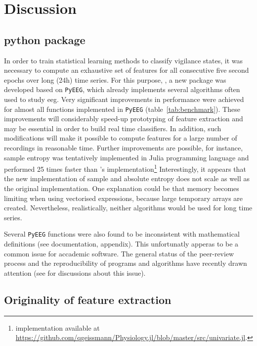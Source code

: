 \section{Discussion} \label{discussion}

\subsection{python package}
 
In order to train statistical learning methods to classify vigilance states,
it was necessary to compute an exhaustive set of features for all consecutive five second epochs
over long (24h) time series.
For this purpose, \pr{}, a new \py{} package was developed based on
\texttt{PyEEG}\citationneeded{},  which already implements several algorithms often used to study \gls{eeg}.
Very significant improvements in performance were achieved for almost all functions implemented in \texttt{PyEEG}
(table~\ref{tab:benchmark}). These improvements will considerably speed-up prototyping of feature extraction
and may be essential in order to build real time classifiers.
In addition, such modifications will make it possible to compute features for a large number
of recordings in reasonable time.
Further improvements are possible, for instance,
sample entropy was tentatively implemented in Julia programming language and performed 25 times faster than
\pr{}'s implementation\footnote{implementation available at
\href{https://github.com/qgeissmann/Physiology.jl/blob/master/src/univariate.jl}{https://github.com/qgeissmann/Physiology.jl/blob/master/src/univariate.jl}.}
Interestingly, it appears that the new implementation of sample and
absolute entropy does not scale as well as the original implementation.
One explanation could be that memory becomes limiting when using vectorised expressions, because large temporary arrays are created.
Nevertheless, realistically, neither algorithms would be used for long time series.

Several \texttt{PyEEG} functions were also found to be inconsistent with mathematical
definitions (see \pr{} documentation, appendix).
This unfortunatly apperas to be a common issue for accademic software.
The general status of the peer-review process and the reproducibility of programs and algorithms have 
recently drawn attention (see  for discussions about this issue).

\subsection{Originality of feature extraction}

